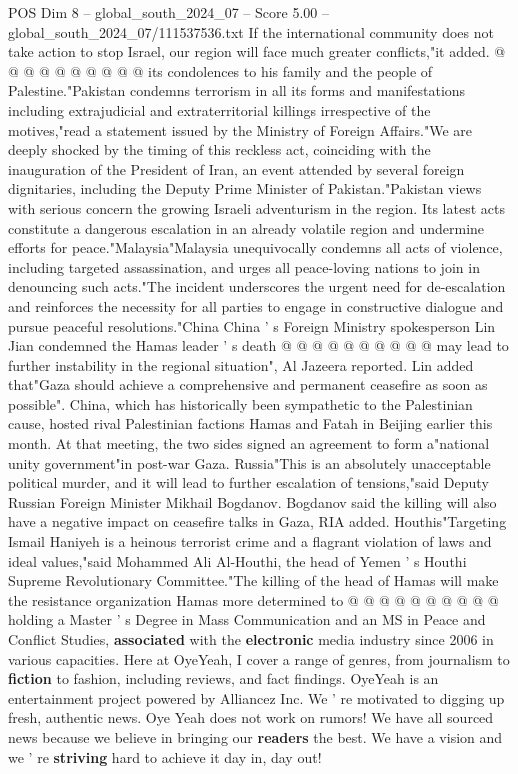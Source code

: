 \begin{textsample}{POS Dim 8 – global\_south\_2024\_07 – Score 5.00 – global\_south\_2024\_07/111537536.txt}
If the international community does not take action to stop Israel, our region will face much greater conflicts,"it added. @ @ @ @ @ @ @ @ @ @ its condolences to his family and the people of Palestine."Pakistan condemns terrorism in all its forms and manifestations including extrajudicial and extraterritorial killings irrespective of the motives,"read a statement issued by the Ministry of Foreign Affairs."We are deeply shocked by the timing of this reckless act, coinciding with the inauguration of the President of Iran, an event attended by several foreign dignitaries, including the Deputy Prime Minister of Pakistan."Pakistan views with serious concern the growing Israeli adventurism in the region.
Its latest acts constitute a dangerous escalation in an already volatile region and undermine efforts for peace."Malaysia"Malaysia unequivocally condemns all acts of violence, including targeted assassination, and urges all peace-loving nations to join in denouncing such acts."The incident underscores the urgent need for de-escalation and reinforces the necessity for all parties to engage in constructive dialogue and pursue peaceful resolutions."China China ' s Foreign Ministry spokesperson Lin Jian condemned the Hamas leader ' s death @ @ @ @ @ @ @ @ @ @ may lead to further instability in the regional situation", Al Jazeera reported.
Lin added that"Gaza should achieve a comprehensive and permanent ceasefire as soon as possible".
China, which has historically been sympathetic to the Palestinian cause, hosted rival Palestinian factions Hamas and Fatah in Beijing earlier this month.
At that meeting, the two sides signed an agreement to form a"national unity government"in post-war Gaza.
Russia"This is an absolutely unacceptable political murder, and it will lead to further escalation of tensions,"said Deputy Russian Foreign Minister Mikhail Bogdanov.
Bogdanov said the killing will also have a negative impact on ceasefire talks in Gaza, RIA added.
Houthis"Targeting Ismail Haniyeh is a heinous terrorist crime and a flagrant violation of laws and ideal values,"said Mohammed Ali Al-Houthi, the head of Yemen ' s Houthi Supreme Revolutionary Committee."The killing of the head of Hamas will make the resistance organization Hamas more determined to @ @ @ @ @ @ @ @ @ @ holding a Master ' s Degree in Mass Communication and an MS in Peace and Conflict Studies, \textbf{associated} with the \textbf{electronic} media industry since 2006 in various capacities.
Here at OyeYeah, I cover a range of genres, from journalism to \textbf{fiction} to fashion, including reviews, and fact findings.
OyeYeah is an entertainment project powered by Alliancez Inc.
We ' re motivated to digging up fresh, authentic news.
Oye Yeah does not work on rumors!
We have all sourced news because we believe in bringing our \textbf{readers} the best.
We have a vision and we ' re \textbf{striving} hard to achieve it day in, day out!

\end{textsample}
